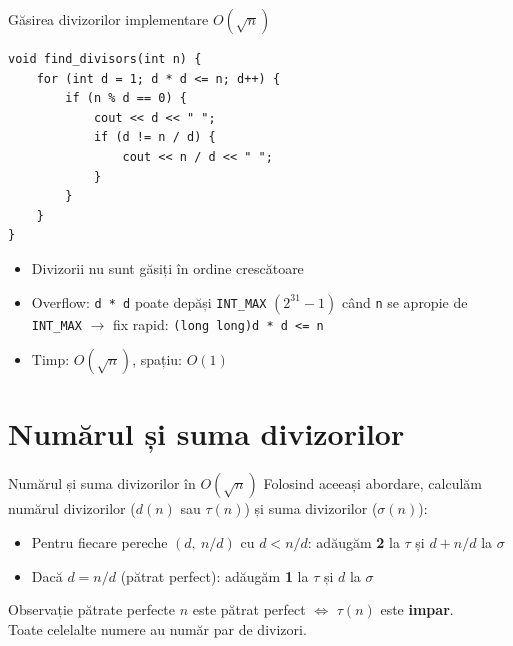 \documentclass[10pt]{beamer}
\begin{document}
\begin{frame}[fragile]{Găsirea divizorilor \textemdash{} implementare $O(\sqrt{n})$}
  \begin{lstlisting}
void find_divisors(int n) {
    for (int d = 1; d * d <= n; d++) {
        if (n % d == 0) {
            cout << d << " ";
            if (d != n / d) {
                cout << n / d << " ";
            }
        }
    }
}
  \end{lstlisting}
  \begin{itemize}
    \item Divizorii nu sunt găsiți în ordine crescătoare
    \item \alert{Overflow:} \lstinline|d * d| poate depăși \lstinline|INT_MAX| $(2^{31}-1)$ când \lstinline|n| se apropie de \lstinline|INT_MAX| $\rightarrow$ fix rapid: \lstinline|(long long)d * d <= n|
    \item Timp: $O(\sqrt{n})$, spațiu: $O(1)$
  \end{itemize}
\end{frame}

\section{Numărul și suma divizorilor}

\begin{frame}{Numărul și suma divizorilor în $O(\sqrt{n})$}
  Folosind aceeași abordare, calculăm numărul divizorilor ($d(n)$ sau $\tau(n)$) și suma divizorilor ($\sigma(n)$):
  \begin{itemize}
    \item Pentru fiecare pereche $(d,\ n/d)$ cu $d < n/d$: adăugăm \textbf{2} la $\tau$ și $d + n/d$ la $\sigma$
    \item Dacă $d = n/d$ (pătrat perfect): adăugăm \textbf{1} la $\tau$ și $d$ la $\sigma$
  \end{itemize}
  \begin{block}{Observație \textemdash{} pătrate perfecte}
    $n$ este pătrat perfect $\Leftrightarrow$ $\tau(n)$ este \textbf{impar}.\\
    Toate celelalte numere au număr par de divizori.
  \end{block}
\end{frame}
\end{document}
